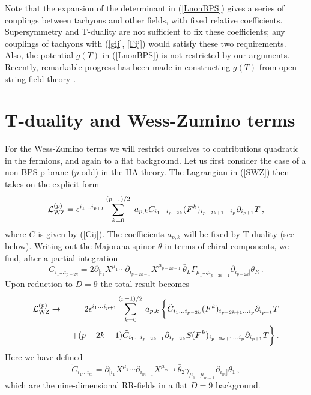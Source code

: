 \documentclass[12pt,a4paper]{article}
\begin{document}
Note that the expansion of the determinant in (\ref{LnonBPS}) gives a series
 of couplings between tachyons and other fields, with fixed
 relative coefficients. Supersymmetry and T-duality are not sufficient
 to fix these coefficients; any couplings of tachyons
 with (\ref{gij}, \ref{Fij}) would satisfy these two requirements.
 Also, the potential $g(T)$ in (\ref{LnonBPS}) is
 not restricted by our arguments. Recently, remarkable progress has been
 made in constructing $g(T)$ from open string field
 theory \cite{Sen6,Sen7,Tay,Berk}.

\section{T-duality and Wess-Zumino terms}

For the Wess-Zumino terms we will restrict ourselves to contributions
 quadratic in the fermions, and again to a flat background.
 Let us first consider the case of a non-BPS p-brane ($p$ odd) in the IIA
 theory. The Lagrangian in
 (\ref{SWZ}) then takes on the explicit form
\begin{equation}
\label{LWZIIA}
  {\cal L}^{(p)}_{\rm WZ} =
  \epsilon^{i_1\ldots i_{p+1}} \sum_{k=0}^{(p-1)/2} \,\,a_{p,k}
  C_{i_1\ldots i_{p-2k}}(F^k)_{i_{p-2k+1}\ldots i_p} \partial_{i_{p+1}}T\,,
\end{equation}
where $C$ is given by (\ref{Cij}). The coefficients $a_{p,k}$ will be
fixed by T-duality (see below).
Writing out the Majorana spinor
 $\theta$ in terms of chiral components, we find, after a partial integration
\begin{equation}
   C_{i_1\ldots i_{p-2k}}=
 2\partial_{[i_1}X^{\mu_1}\cdots \partial_{i_{p-2k-1}}X^{\mu_{p-2k-1}}\,
   \bar\theta_L\Gamma_{\mu_1\ldots \mu_{p-2k-1}}
   \partial_{i_{p-2k}]}\theta_R\,.
\end{equation}
Upon reduction to $D=9$ the total result becomes
\begin{eqnarray}
  {\cal L}^{(p)}_{\rm WZ}&\to&
  2\epsilon^{i_1\ldots i_{p+1}} \sum_{k=0}^{(p-1)/2} \,a_{p,k}\,\bigg\{
    \tilde C_{i_1\ldots i_{p-2k}} (F^k)_{i_{p-2k+1}\ldots i_p}
     \partial_{i_{p+1}}T
   \nonumber\\
  &&\ + (p-2k-1)
 \tilde C_{i_1\ldots i_{p-2k-1}}\partial_{i_{p-2k}}S
   (F^k)_{i_{p-2k+1}\ldots i_p}
     \partial_{i_{p+1}}T\bigg\} \,.
\end{eqnarray}
Here we have defined
\begin{equation}
  \tilde C_{i_1\ldots i_m}=
 \partial_{[i_1}X^{\mu_1}\cdots \partial_{i_{m-1}}X^{\mu_{m-1}}\,
   \bar\theta_2\gamma_{\mu_1\ldots \mu_{m-1}}
   \partial_{i_{m}]}\theta_1\,,
\end{equation}
which are the nine-dimensional RR-fields in a flat $D=9$ background.
\end{document}
